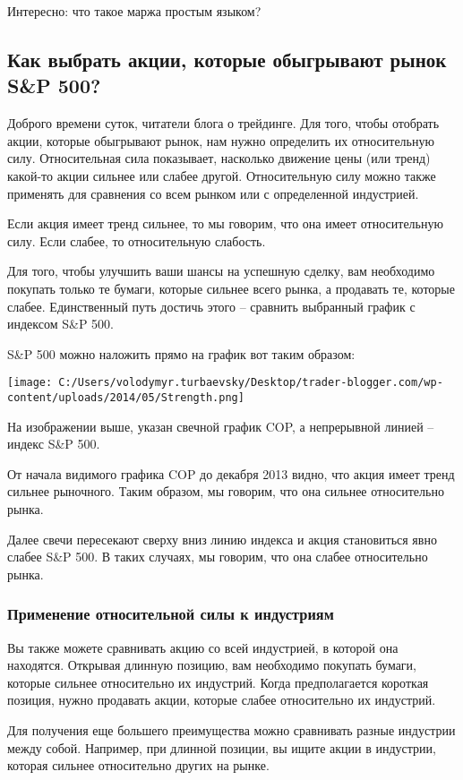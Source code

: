 \documentclass[a5paper]{article}
\begin{document}
Интересно: что такое маржа простым языком?

\subsection{Как выбрать акции, которые обыгрывают рынок S\&P 500?}

Доброго времени суток, читатели блога о трейдинге. Для того, чтобы отобрать акции, которые обыгрывают рынок, нам нужно определить их относительную силу. Относительная сила показывает, насколько движение цены (или тренд) какой-то акции сильнее или слабее другой. Относительную силу можно также применять для сравнения со всем рынком или с определенной индустрией.

Если акция имеет тренд сильнее, то мы говорим, что она имеет относительную силу. Если слабее, то относительную слабость.

Для того, чтобы улучшить ваши шансы на успешную сделку, вам необходимо покупать только те бумаги, которые сильнее всего рынка, а продавать те, которые слабее. Единственный путь достичь этого – сравнить выбранный график с индексом S\&P 500.

S\&P 500 можно наложить прямо на график вот таким образом:

\texttt{[image: C:/Users/volodymyr.turbaevsky/Desktop/trader-blogger.com/wp-content/uploads/2014/05/Strength.png]}

На изображении выше, указан свечной график COP, а непрерывной линией – индекс S\&P 500.

От начала видимого графика COP до декабря 2013 видно, что акция имеет тренд сильнее рыночного. Таким образом, мы говорим, что она сильнее относительно рынка.

Далее свечи пересекают сверху вниз линию индекса и акция становиться
явно слабее S\&P 500. В таких случаях, мы говорим, что она слабее
относительно рынка.

\subsubsection{Применение относительной силы к индустриям}

Вы также можете сравнивать акцию со всей индустрией, в которой она находятся. Открывая длинную позицию, вам необходимо покупать бумаги, которые сильнее относительно их индустрий. Когда предполагается короткая позиция, нужно продавать акции, которые слабее относительно их индустрий.

Для получения еще большего преимущества можно сравнивать разные индустрии между собой. Например, при длинной позиции, вы ищите акции в индустрии, которая сильнее относительно других на рынке.
\end{document}
